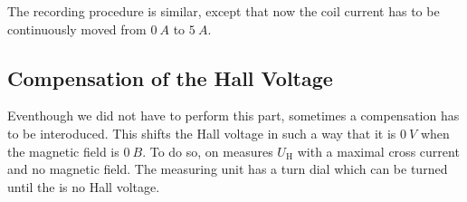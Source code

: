 The recording procedure is similar, except that now the coil current has to be continuously moved
from $\SI{0}{A}$ to $\SI{5}{A}$.

\subsection{Compensation of the Hall Voltage}
\label{sec:compensation}
Eventhough we did not have to perform this part, sometimes a compensation has to be interoduced.
This shifts the Hall voltage in such a way that it is $\SI{0}{V}$ when the magnetic field is
$\SI{0}{B}$. To do so, on measures $U_\text{H}$ with a maximal cross current and no magnetic field.
The measuring unit has a turn dial which can be turned until the is no Hall voltage.

